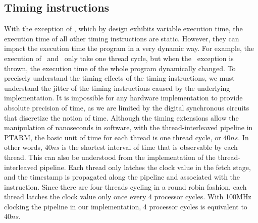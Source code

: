 \subsection{Timing instructions}
\label{sec:jitter_of_timing_instructions}
With the exception of \delayuntil, which by design exhibits variable execution time, the execution time of all other timing instructions are static.  
However, they can impact the execution time the program in a very dynamic way.
For example, the execution of \exceptiononexpire\ and \deactivateexception\ only take one thread cycle, but when the \timerexpired\ exception is thrown, the execution time of the whole program dynamically changed. 
To precisely understand the timing effects of the timing instructions, we must understand the jitter of the timing instructions caused by the underlying implementation.
It is impossible for any hardware implementation to provide absolute precision of time, as we are limited by the digital synchronous circuits that discretize the notion of time. 
Although the timing extensions allow the manipulation of nanoseconds in software, with the thread-interleaved pipeline in PTARM, the basic unit of time for each thread is one thread cycle, or $40ns$.
In other words, $40ns$ is the shortest interval of time that is observable by each thread.
This can also be understood from the implementation of the thread-interleaved pipeline.
Each thread only latches the clock value in the fetch stage, and the timestamp is propagated along the pipeline and associated with the instruction. 
Since there are four threads cycling in a round robin fashion, each thread latches the clock value only once every 4 processor cycles. 
With 100MHz clocking the pipeline in our implementation, 4 processor cycles is equivalent to $40ns$.

